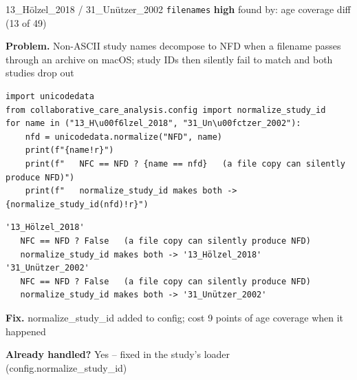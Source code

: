 \documentclass[9pt, t, handout]{beamer}
\newcommand{\ans}[1]{\textcolor{structure.fg}{#1}}
\begin{document}
\begin{frame}[fragile]{13\_Hölzel\_2018 / 31\_Unützer\_2002 \quad \texttt{filenames}}
  {\scriptsize\textcolor{orange!80!black}{\textbf{high}} \quad
   found by: age coverage diff \quad (13 of 49)}
  \vspace{3pt}

  {\footnotesize \textbf{Problem.} Non-ASCII study names decompose to NFD when a filename passes through an archive on macOS; study IDs then silently fail to match and both studies drop out}
  \vspace{4pt}

  \begin{Verbatim}[fontsize=\tiny, frame=single, framesep=2pt, label=\tiny reproduce]
import unicodedata
from collaborative_care_analysis.config import normalize_study_id
for name in ("13_H\u00f6lzel_2018", "31_Un\u00fctzer_2002"):
    nfd = unicodedata.normalize("NFD", name)
    print(f"{name!r}")
    print(f"   NFC == NFD ? {name == nfd}   (a file copy can silently produce NFD)")
    print(f"   normalize_study_id makes both -> {normalize_study_id(nfd)!r}")
  \end{Verbatim}
  \begin{Verbatim}[fontsize=\tiny, frame=single, framesep=2pt, label=\tiny output]
'13_Hölzel_2018'
   NFC == NFD ? False   (a file copy can silently produce NFD)
   normalize_study_id makes both -> '13_Hölzel_2018'
'31_Unützer_2002'
   NFC == NFD ? False   (a file copy can silently produce NFD)
   normalize_study_id makes both -> '31_Unützer_2002'
  \end{Verbatim}
  \vspace{2pt}

  {\footnotesize \textbf{Fix.} normalize\_study\_id added to config; cost 9 points of age coverage when it happened}
  \vspace{2pt}

  {\footnotesize \textbf{Already handled?} \ans{Yes} -- fixed in the study's loader
   (config.normalize\_study\_id)}
\end{frame}
\end{document}
